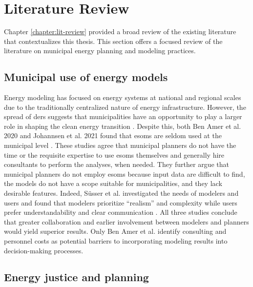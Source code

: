 \section{Literature Review}
Chapter \ref{chapter:lit-review} provided a broad review of the existing
literature that contextualizes this thesis. This section offers a focused review
of the literature on municipal energy planning and modeling practices.

\subsection{Municipal use of energy models}

Energy modeling has focused on energy systems at national and regional scales
due to the traditionally centralized nature of energy infrastructure. However,
the spread of \acp{der} suggests that municipalities have an opportunity to play
a larger role in shaping the clean energy transition
\cite{shen_facilitating_2021}. Despite this, both Ben Amer et al. 2020 and
Johannsen et al. 2021 found that \acp{esom} are seldom used at the municipal
level \cite{ben_amer_too_2020,johannsen_designing_2021}. These studies agree
that municipal planners do not have the time or the requisite expertise to use
\acp{esom} themselves and generally hire consultants to perform the analyses,
when needed. They further argue that municipal planners do not employ \acp{esom}
because input data are difficult to find, the models do not have a scope
suitable for municipalities, and they lack desirable features. Indeed,
S\"{u}sser et al. investigated the needs of modelers and users and found that
modelers prioritize ``realism'' and complexity while users prefer
understandability and clear communication \cite{susser_better_2022}. All three
studies conclude that greater collaboration and earlier involvement between
modelers and planners would yield superior results. Only Ben Amer et al.
identify consulting and personnel costs as potential barriers to incorporating
modeling results into decision-making processes.


\subsection{Energy justice and planning}

